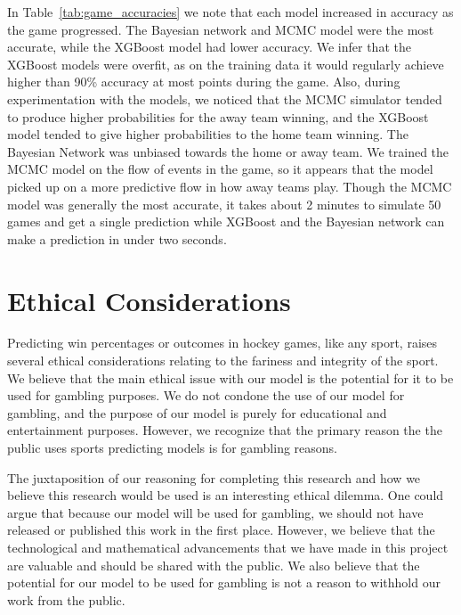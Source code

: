 \documentclass[11pt]{article}
\begin{document}

In Table~\ref{tab:game_accuracies} we note that each model increased in accuracy as the game progressed. 
The Bayesian network and MCMC model were the most accurate, while the XGBoost model had lower accuracy.
We infer that the XGBoost models were overfit, as on the training data it would regularly achieve higher than 90\% accuracy at most points during the game. 
Also, during experimentation with the models, we noticed that the MCMC simulator tended to produce higher probabilities for the away team winning, 
and the XGBoost model tended to give higher probabilities to the home team winning. 
The Bayesian Network was unbiased towards the home or away team. 
We trained the MCMC model on the flow of events in the game, so it appears that the model picked up on a more predictive flow in how away teams play. 
Though the MCMC model was generally the most accurate, it takes about 2 minutes to simulate 50 games and get a single prediction while XGBoost and the Bayesian network can make a prediction in under two seconds.

\section{Ethical Considerations}
Predicting win percentages or outcomes in hockey games, like any sport, raises several ethical considerations relating to the fariness and integrity of the sport. We believe that the main ethical issue with our model is the potential for it to be used for gambling purposes. 
We do not condone the use of our model for gambling, and the purpose of our model is purely for educational and entertainment purposes. However, we recognize that the primary reason the the public uses sports predicting models is for gambling reasons.

The juxtaposition of our reasoning for completing this research and how we believe this research would be used is an interesting ethical dilemma. 
One could argue that because our model will be used for gambling, we should not have released or published this work in the first place. 
However, we believe that the technological and mathematical advancements that we have made in this project are valuable and should be shared with the public. 
We also believe that the potential for our model to be used for gambling is not a reason to withhold our work from the public.
\end{document}
